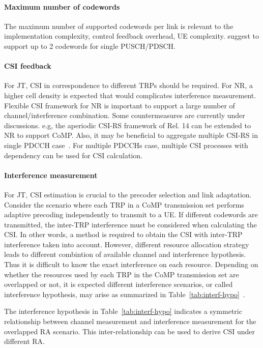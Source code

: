 \documentclass[a4paper,12pt]{article}%
\begin{document}
{\paragraph{Maximum number of codewords}

The maximum number of supported codewords per link is relevant to the implementation complexity, control feedback overhead, UE complexity. \cite{R1-1710055} suggest to support up to 2 codewords for single PUSCH/PDSCH.

\paragraph{CSI feedback}

For JT, CSI in correspondence to different TRPs should be required. For NR, a higher cell density is expected that would complicates interference measurement. Flexible CSI framework for NR is important to support a large number of channel/interference combination. Some countermeasures are currently under discussions. e.g, the aperiodic CSI-RS framework of Rel. 14 can be extended to NR to support CoMP. Also, it may be beneficial to aggregate multiple CSI-RS in single PDCCH case~\cite{R1-1710180}. For multiple PDCCHs case, multiple CSI processes with dependency can be used for CSI calculation.

\paragraph{Interference measurement}

For JT, CSI estimation is crucial to the precoder selection and link adaptation. Consider the scenario where each TRP in a CoMP transmission set performs adaptive precoding independently to transmit to a UE. If different codewords are transmitted, the inter-TRP interference must be considered when calculating the CSI. In other words, a method is required to obtain the CSI with inter-TRP interference taken into account. However, different resource allocation strategy leads to different combintion of available channel and interference hypothesis. Thus it is difficult to know the exact interference on each resource. Depending on whether the resources used by each TRP in the CoMP transmission set are overlapped or not, it is expected different interference scenarios, or called interference hypothesis, may arise as summarized in Table~\ref{tab:interf-hypo}~\cite{R1-1710451}.

The interference hypothesis in Table~\ref{tab:interf-hypo} indicates a symmetric relationship between channel measurement and interference measurement for the overlapped RA scenario. This inter-relationship can be used to derive CSI under different RA.


}
\end{document}
